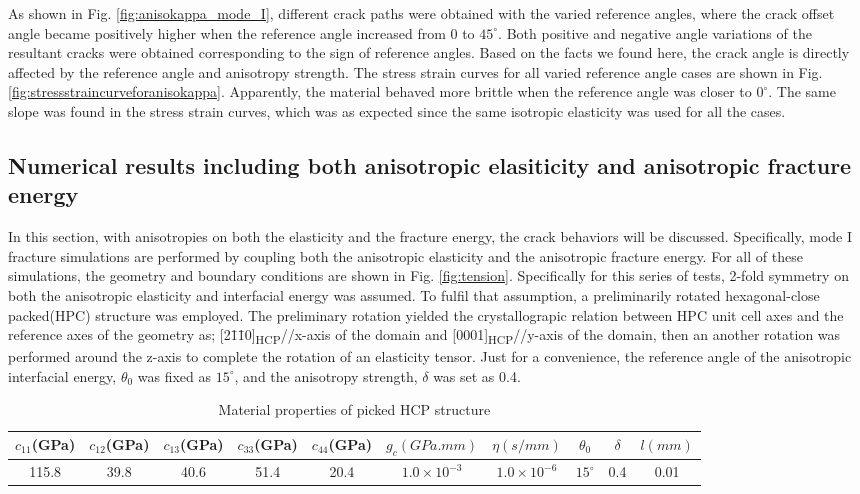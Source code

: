 \documentclass[3p,10pt,sort&compress]{elsarticle}
\begin{document}
As shown in Fig. \ref{fig:anisokappa_mode_I}, different crack paths were obtained with the varied reference angles, where the crack offset angle became positively higher when the reference angle increased from $0$ to $45^{\circ}$. Both positive and negative angle variations of the resultant cracks were obtained corresponding to the sign of reference angles. Based on the facts we found here, the crack angle is directly affected by the reference angle and anisotropy strength. The stress strain curves for all varied reference angle cases are shown in Fig. \ref{fig:stressstraincurveforanisokappa}. Apparently, the material behaved more brittle when the reference angle was closer to $0^{\circ}$. The same slope was found in the stress strain curves, which was as expected since the same isotropic elasticity was used for all the cases.

\subsection{Numerical results including both anisotropic elasiticity and anisotropic fracture energy}
In this section, with anisotropies on both the elasticity and the fracture energy, the crack behaviors will be discussed. Specifically, mode I fracture simulations are performed by coupling both the anisotropic elasticity and the anisotropic fracture energy. For all of these simulations, the geometry and boundary conditions are shown in Fig. \ref{fig:tension}. Specifically for this series of tests, 2-fold symmetry on both the anisotropic elasticity and interfacial energy was assumed. To fulfil that assumption, a preliminarily rotated hexagonal-close packed(HPC) structure was employed. The preliminary rotation yielded the crystallograpic relation between HPC unit cell axes and the reference axes of the geometry as; [2\={1}\={1}0]\textsubscript{HCP}//x-axis of the domain and [0001]\textsubscript{HCP}//y-axis of the domain, then an another rotation was performed around the z-axis to complete the rotation of an elasticity tensor. Just for a convenience, the reference angle of the anisotropic interfacial energy, $\theta_0$ was fixed as $15^{\circ}$, and the anisotropy strength, $\delta$ was set as 0.4.

 \begin{table*}[!htb]
   \centering
   \begin{tabular}{ |c|c|c|c|c|c|c|c|c|c| }
     \hline
     $c_{11}$(GPa) & $c_{12}$(GPa) & $c_{13}$(GPa) & $c_{33}$(GPa) & $c_{44}$(GPa) & $g_c(GPa.mm)$ & $\eta(s/mm)$ & $\theta_0$ & $\delta$ & $l(mm)$\\
     \hline
     115.8  & 39.8  & 40.6 & 51.4 & 20.4 & $1.0\times 10^{-3}$ & $1.0\times 10^{-6}$ & $15^{\circ}$ & 0.4 & 0.01\\
     \hline
   \end{tabular}
   \caption{Material properties of picked HCP structure}
   \label{table:cd}
 \end{table*}
\end{document}
